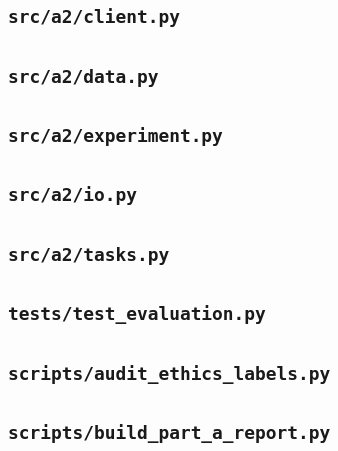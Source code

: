 

\subsection*{\nolinkurl{src/a2/client.py}}



\subsection*{\nolinkurl{src/a2/data.py}}



\subsection*{\nolinkurl{src/a2/experiment.py}}



\subsection*{\nolinkurl{src/a2/io.py}}



\subsection*{\nolinkurl{src/a2/tasks.py}}



\subsection*{\nolinkurl{tests/test_evaluation.py}}



\subsection*{\nolinkurl{scripts/audit_ethics_labels.py}}



\subsection*{\nolinkurl{scripts/build_part_a_report.py}}

